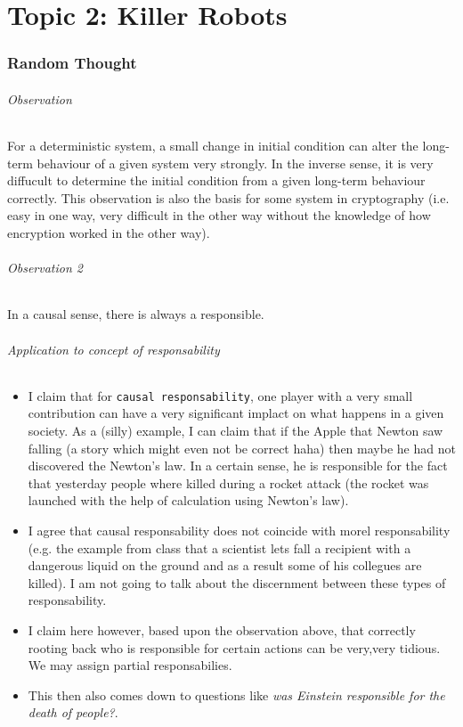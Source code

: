 \documentclass[../main/main.tex]{subfiles}
\begin{document}
\newpage
\part{Topic 2: Killer Robots}

\section{Random Thought}
\paragraph{Observation}
For a deterministic system, a small change in initial condition can alter the long-term behaviour of a given system very strongly. In the inverse sense, it is very diffucult to determine the initial condition from a given long-term behaviour correctly. This observation is also the basis for some system in cryptography (i.e. easy in one way, very difficult in the other way without the knowledge of how encryption worked in the other way).

\paragraph{Observation 2}
In a causal sense, there is always a responsible. 

\paragraph{Application to concept of responsability}
\begin{itemize}
\item I claim that for \texttt{causal responsability}, one player with a very small contribution can have a very significant implact on what happens in a given society. As a (silly) example, I can claim that if the Apple that Newton saw falling (a story which might even not be correct haha) then maybe he had not discovered the Newton's law. In a certain sense, he is responsible for the fact that yesterday people where killed during a rocket attack (the rocket was launched with the help of calculation using Newton's law).

\item I agree that causal responsability does not coincide with morel responsability (e.g. the example from class that a scientist lets fall a recipient with a dangerous liquid on the ground and as a result some of his collegues are killed). I am not going to talk about the discernment between these types of responsability.

\item I claim here however, based upon the observation above, that correctly rooting back who is responsible for certain actions can be very,very tidious. We may assign partial responsabilies.

\item This then also comes down to questions like \textit{was Einstein responsible for the death of people?}.
\end{itemize}
\end{document}
